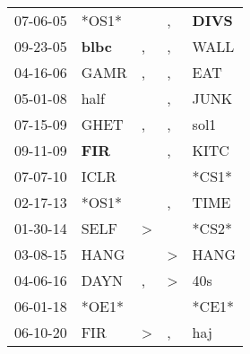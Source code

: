 \begin{supertabular}{p{0.07\textwidth}p{0.06\textwidth}p{0.02\textwidth}p{0.02\textwidth}p{0.06\textwidth}}
 07-06-05\textsuperscript{} &                            *OS1* &                  &                , &  \textbf{DIVS\textsuperscript{}} \\
 09-23-05\textsuperscript{} &  \textbf{blbc\textsuperscript{}} &                , &                , &           WALL\textsuperscript{} \\
 04-16-06\textsuperscript{} &           GAMR\textsuperscript{} &                , &                , &            EAT\textsuperscript{} \\
 05-01-08\textsuperscript{} &           half\textsuperscript{} &                  &                , &           JUNK\textsuperscript{} \\
 07-15-09\textsuperscript{} &           GHET\textsuperscript{} &                , &                , &           sol1\textsuperscript{} \\
 09-11-09\textsuperscript{} &   \textbf{FIR\textsuperscript{}} &                  &                , &           KITC\textsuperscript{} \\
 07-07-10\textsuperscript{} &           ICLR\textsuperscript{} &                  &                  &                            *CS1* \\
 02-17-13\textsuperscript{} &                            *OS1* &                  &                , &           TIME\textsuperscript{} \\
 01-30-14\textsuperscript{} &           SELF\textsuperscript{} &     \textgreater &                  &                            *CS2* \\
 03-08-15\textsuperscript{} &           HANG\textsuperscript{} &                  &     \textgreater &           HANG\textsuperscript{} \\
 04-06-16\textsuperscript{} &           DAYN\textsuperscript{} &                , &     \textgreater &            40s\textsuperscript{} \\
 06-01-18\textsuperscript{} &                            *OE1* &                  &                  &                            *CE1* \\
 06-10-20\textsuperscript{} &            FIR\textsuperscript{} &     \textgreater &                , &            haj\textsuperscript{} \\
\end{supertabular}
